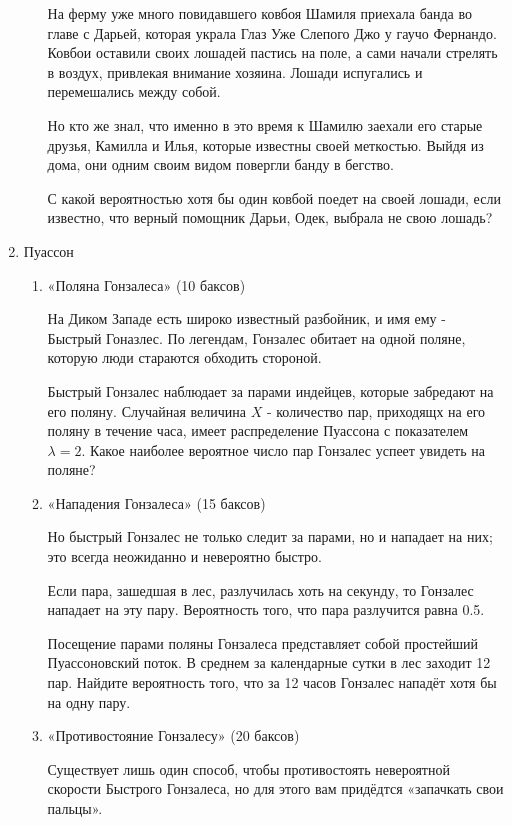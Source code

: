 \documentclass[11pt, a4paper]{article}
\theoremstyle{definition}
\begin{document}
\begin{enumerate}
\begin{enumerate}
    На ферму уже много повидавшего ковбоя Шамиля приехала банда во главе с Дарьей, которая украла Глаз Уже Слепого Джо у гаучо Фернандо. Ковбои оставили своих лошадей пастись на поле, а сами начали стрелять в воздух, привлекая внимание хозяина. Лошади испугались и перемешались между собой.
    
    Но кто же знал, что именно в это время к Шамилю заехали его старые друзья, Камилла и Илья, которые известны своей меткостью. Выйдя из дома, они одним своим видом повергли банду в бегство.
    
    С какой вероятностью хотя бы один ковбой поедет на своей лошади, если известно, что верный помощник Дарьи, Одек, выбрала не свою лошадь?
\end{enumerate}    
    

    \item Пуассон 
\begin{enumerate}
    \item «Поляна Гонзалеса» (10 баксов)
    
    На Диком Западе есть широко известный разбойник, и имя ему - Быстрый Гоназлес. По легендам, Гонзалес обитает на одной поляне, которую люди стараются обходить стороной.
    
    Быстрый Гонзалес наблюдает за парами индейцев, которые забредают на его поляну. Случайная величина $X$ - количество пар, приходящх на его поляну в течение часа, имеет распределение Пуассона с показателем $\lambda = 2$. Какое наиболее вероятное число пар Гонзалес успеет увидеть на поляне?
    
    \item «Нападения Гонзалеса» (15 баксов)
    
    Но быстрый Гонзалес не только следит за парами, но и нападает на них; это всегда неожиданно и невероятно быстро.
    
    Если пара, зашедшая в лес, разлучилась хоть на секунду, то Гонзалес нападает на эту пару. Вероятность того, что пара разлучится равна 0.5.
    
    Посещение парами поляны Гонзалеса представляет собой простейший Пуассоновский поток. В среднем за календарные сутки в лес заходит 12 пар. Найдите вероятность того, что за 12 часов Гонзалес нападёт хотя бы на одну пару.

    \item «Противостояние Гонзалесу» (20 баксов)
    
    Существует лишь один способ, чтобы противостоять невероятной скорости Быстрого Гонзалеса, но для этого вам придёдтся «запачкать свои пальцы».
    

\end{enumerate}
\end{enumerate}
\end{document}
